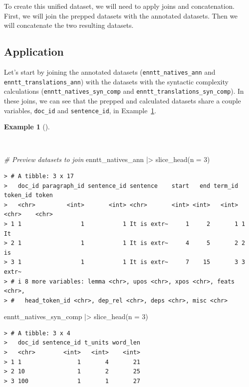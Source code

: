 \documentclass[
  letterpaper,
  DIV=11,
  numbers=noendperiod]{scrreport}
\newenvironment{Shaded}{\begin{snugshade}}{\end{snugshade}}
\newcommand{\AttributeTok}[1]{\textcolor[rgb]{0.00,0.00,0.00}{#1}}
\newcommand{\CommentTok}[1]{\textcolor[rgb]{0.00,0.00,0.00}{\textit{#1}}}
\newcommand{\DecValTok}[1]{\textcolor[rgb]{0.00,0.00,0.00}{#1}}
\newcommand{\FunctionTok}[1]{\textcolor[rgb]{0.00,0.00,0.00}{#1}}
\newcommand{\NormalTok}[1]{\textcolor[rgb]{0.00,0.00,0.00}{#1}}
\newcommand{\SpecialCharTok}[1]{\textcolor[rgb]{0.00,0.00,0.00}{#1}}
\theoremstyle{definition}
\newtheorem{example}{Example}[chapter]
\theoremstyle{remark}
\begin{document}
To create this unified dataset, we will need to apply joins and
concatenation. First, we will join the prepped datasets with the
annotated datasets. Then we will concatenate the two resulting datasets.

\hypertarget{sec-td-merging-application}{%
\subsection{Application}\label{sec-td-merging-application}}

Let's start by joining the annotated datasets
(\texttt{enntt\_natives\_ann} and \texttt{enntt\_translations\_ann})
with the datasets with the syntactic complexity calculations
(\texttt{enntt\_natives\_syn\_comp} and
\texttt{enntt\_translations\_syn\_comp}). In these joins, we can see
that the prepped and calculated datasets share a couple variables,
\texttt{doc\_id} and \texttt{sentence\_id}, in
Example~\ref{exm-td-merging-join-prepped-syn-comp}.

\begin{example}[]\protect\hypertarget{exm-td-merging-join-prepped-syn-comp}{}\label{exm-td-merging-join-prepped-syn-comp}

~

\begin{Shaded}
\begin{Highlighting}[]
\CommentTok{\# Preview datasets to join}
\NormalTok{enntt\_natives\_ann }\SpecialCharTok{|\textgreater{}} 
  \FunctionTok{slice\_head}\NormalTok{(}\AttributeTok{n =} \DecValTok{3}\NormalTok{)}
\end{Highlighting}
\end{Shaded}

\begin{verbatim}
> # A tibble: 3 x 17
>   doc_id paragraph_id sentence_id sentence    start   end term_id token_id token
>   <chr>         <int>       <int> <chr>       <int> <int>   <int> <chr>    <chr>
> 1 1                 1           1 It is extr~     1     2       1 1        It   
> 2 1                 1           1 It is extr~     4     5       2 2        is   
> 3 1                 1           1 It is extr~     7    15       3 3        extr~
> # i 8 more variables: lemma <chr>, upos <chr>, xpos <chr>, feats <chr>,
> #   head_token_id <chr>, dep_rel <chr>, deps <chr>, misc <chr>
\end{verbatim}

\begin{Shaded}
\begin{Highlighting}[]
\NormalTok{enntt\_natives\_syn\_comp }\SpecialCharTok{|\textgreater{}} 
  \FunctionTok{slice\_head}\NormalTok{(}\AttributeTok{n =} \DecValTok{3}\NormalTok{)}
\end{Highlighting}
\end{Shaded}

\begin{verbatim}
> # A tibble: 3 x 4
>   doc_id sentence_id t_units word_len
>   <chr>        <int>   <int>    <int>
> 1 1                1       4       21
> 2 10               1       2       25
> 3 100              1       1       27
\end{verbatim}

\end{example}
\end{document}
